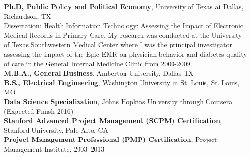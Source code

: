 \documentclass{article}
\begin{document}
\noindent
{\bfseries Ph.D, Public Policy and Political Economy}, University of Texas at Dallas, Richardson, TX \\
Dissertation: Health Information Technology: Assessing the Impact of Electronic Medical Records in Primary Care. My research was conducted at the University of Texas Southwestern Medical Center where I was the principal investigator assessing the impact of the Epic EMR on physician behavior and diabetes quality of care in the General Internal Medicine Clinic from 2000-2009. \\
{\bfseries M.B.A., General Business}, Amberton University, Dallas TX \\
{\bfseries B.S., Electrical Engineering}, Washington University in St. Louis, St. Louis, MO \\
{\bfseries Data Science Specialization}, Johns Hopkins University through Coursera (Expected Finish 2016) \\
{\bfseries Stanford Advanced Project Management (SCPM) Certification}, Stanford University, Palo Alto, CA \\
{\bfseries Project Management Professional (PMP) Certification}, Project Management Institute, 2003--2013
\end{document}
